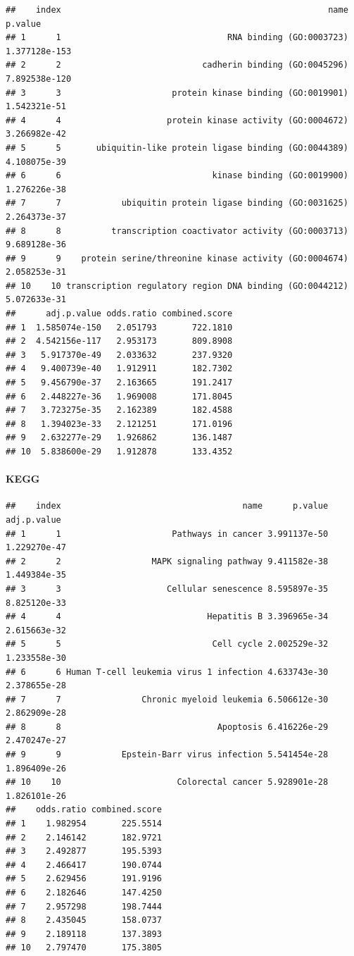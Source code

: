 \documentclass[
]{article}
\begin{document}
\begin{verbatim}
##    index                                                     name       p.value
## 1      1                                 RNA binding (GO:0003723) 1.377128e-153
## 2      2                            cadherin binding (GO:0045296) 7.892538e-120
## 3      3                      protein kinase binding (GO:0019901)  1.542321e-51
## 4      4                     protein kinase activity (GO:0004672)  3.266982e-42
## 5      5       ubiquitin-like protein ligase binding (GO:0044389)  4.108075e-39
## 6      6                              kinase binding (GO:0019900)  1.276226e-38
## 7      7            ubiquitin protein ligase binding (GO:0031625)  2.264373e-37
## 8      8          transcription coactivator activity (GO:0003713)  9.689128e-36
## 9      9    protein serine/threonine kinase activity (GO:0004674)  2.058253e-31
## 10    10 transcription regulatory region DNA binding (GO:0044212)  5.072633e-31
##      adj.p.value odds.ratio combined.score
## 1  1.585074e-150   2.051793       722.1810
## 2  4.542156e-117   2.953173       809.8908
## 3   5.917370e-49   2.033632       237.9320
## 4   9.400739e-40   1.912911       182.7302
## 5   9.456790e-37   2.163665       191.2417
## 6   2.448227e-36   1.969008       171.8045
## 7   3.723275e-35   2.162389       182.4588
## 8   1.394023e-33   2.121251       171.0196
## 9   2.632277e-29   1.926862       136.1487
## 10  5.838600e-29   1.912878       133.4352
\end{verbatim}

\hypertarget{kegg}{%
\paragraph{KEGG}\label{kegg}}

\begin{verbatim}
##    index                                    name      p.value  adj.p.value
## 1      1                      Pathways in cancer 3.991137e-50 1.229270e-47
## 2      2                  MAPK signaling pathway 9.411582e-38 1.449384e-35
## 3      3                     Cellular senescence 8.595897e-35 8.825120e-33
## 4      4                             Hepatitis B 3.396965e-34 2.615663e-32
## 5      5                              Cell cycle 2.002529e-32 1.233558e-30
## 6      6 Human T-cell leukemia virus 1 infection 4.633743e-30 2.378655e-28
## 7      7                Chronic myeloid leukemia 6.506612e-30 2.862909e-28
## 8      8                               Apoptosis 6.416226e-29 2.470247e-27
## 9      9            Epstein-Barr virus infection 5.541454e-28 1.896409e-26
## 10    10                       Colorectal cancer 5.928901e-28 1.826101e-26
##    odds.ratio combined.score
## 1    1.982954       225.5514
## 2    2.146142       182.9721
## 3    2.492877       195.5393
## 4    2.466417       190.0744
## 5    2.629456       191.9196
## 6    2.182646       147.4250
## 7    2.957298       198.7444
## 8    2.435045       158.0737
## 9    2.189118       137.3893
## 10   2.797470       175.3805
\end{verbatim}
\end{document}
